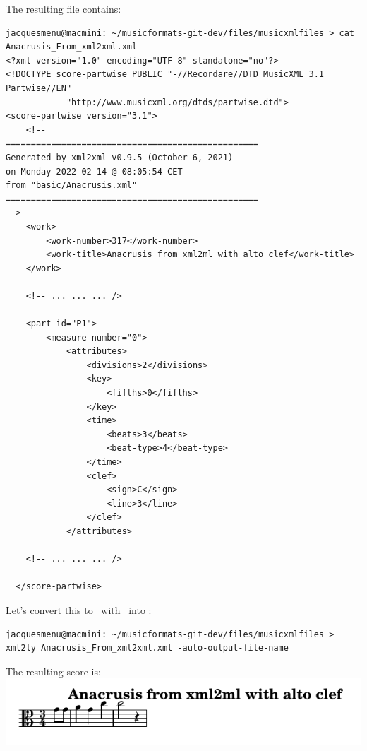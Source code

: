 The resulting file  contains:
\begin{lstlisting}[language=MusicXML]
jacquesmenu@macmini: ~/musicformats-git-dev/files/musicxmlfiles > cat Anacrusis_From_xml2xml.xml
<?xml version="1.0" encoding="UTF-8" standalone="no"?>
<!DOCTYPE score-partwise PUBLIC "-//Recordare//DTD MusicXML 3.1 Partwise//EN"
			"http://www.musicxml.org/dtds/partwise.dtd">
<score-partwise version="3.1">
    <!--
==================================================
Generated by xml2xml v0.9.5 (October 6, 2021)
on Monday 2022-02-14 @ 08:05:54 CET
from "basic/Anacrusis.xml"
==================================================
-->
    <work>
        <work-number>317</work-number>
        <work-title>Anacrusis from xml2ml with alto clef</work-title>
    </work>

	<!-- ... ... ... />
	
    <part id="P1">
        <measure number="0">
            <attributes>
                <divisions>2</divisions>
                <key>
                    <fifths>0</fifths>
                </key>
                <time>
                    <beats>3</beats>
                    <beat-type>4</beat-type>
                </time>
                <clef>
                    <sign>C</sign>
                    <line>3</line>
                </clef>
            </attributes>

	<!-- ... ... ... />
	
  </score-partwise>
\end{lstlisting}

Let's convert this to \lily\ with \xmlToLy\ into :
\begin{lstlisting}[language=Terminal]
jacquesmenu@macmini: ~/musicformats-git-dev/files/musicxmlfiles > xml2ly Anacrusis_From_xml2xml.xml -auto-output-file-name
\end{lstlisting}

The resulting score is:\\
\includegraphics[scale=0.7]{../graphics/Anacrusis_From_xml2xml.png}

